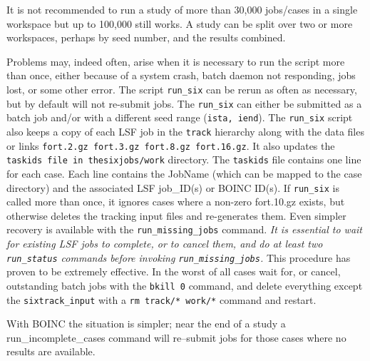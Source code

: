 \documentclass{cernatsnote}    %
\begin{document}
It is not recommended to run a study of more than 30,000 jobs/cases in a
single workspace but up to 100,000 still works. A study can be split 
over two or more workspaces, perhaps by seed number, and the results combined.

Problems may, indeed often, arise when it is necessary to run the script more than once,
either because of a system crash, batch daemon not responding, jobs lost, or some other error.
The script {\tt run\_six} can be rerun as often as necessary, but by default will not re-submit
jobs. The {\tt run\_six} can either be submitted as a batch job and/or with a different seed range
({\tt ista, iend}). 
The {\tt run\_six} script also keeps a copy of each LSF job in the {\tt track}
hierarchy along with the data files or links 
{\tt fort.2.gz fort.3.gz fort.8.gz fort.16.gz}. 
It also updates the {\tt taskids file in the}{\tt sixjobs/work} directory.
The {\tt taskids} file contains one line for each case. Each line
contains the JobName (which can be mapped to the case directory) and the
associated LSF job\_ID(s) or BOINC ID(s). 
If {\tt run\_six} is called more than once, it ignores cases
where a non-zero fort.10.gz exists, but otherwise deletes the tracking input files and 
re-generates them. Even simpler recovery is available with the 
{\tt run\_missing\_jobs} command.
\emph{It is essential to wait for existing LSF jobs to complete, or to cancel them, 
and do at least two {\tt run\_status} commands before invoking {\tt run\_missing\_jobs}.}
This procedure has proven to be extremely effective.
In the worst of all cases wait for, or cancel, outstanding batch jobs 
with the {\tt bkill 0} command, 
and delete everything except the {\tt sixtrack\_input}  with a
{\tt rm track/* work/*} command and restart.  

With BOINC the situation is simpler; near the end of a study a {run\_incomplete\_cases}
command will re--submit jobs for those cases where no results are available.
\end{document}
